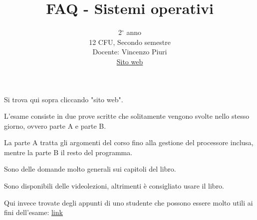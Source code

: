 \documentclass{article}
\title{FAQ - \textbf{Sistemi operativi}}
\date{}
\author{
	2$^{\circ}$ anno\\12 CFU, Secondo semestre\\
	Docente: Vincenzo Piuri\\ 
	\href{https://vpiuriso.ariel.ctu.unimi.it/v5/home/Default.aspx}{Sito web}
}
\begin{document}
 
	\maketitle
	
	\begin{QuestionList}
		
		 {
		     Si trova qui sopra cliccando "sito web".
		 }
		
		 {
		    L'esame consiste in due prove scritte che solitamente vengono svolte nello stesso giorno, ovvero parte A e parte B.
		    
		    La parte A tratta gli argomenti del corso fino alla gestione del processore inclusa, mentre la parte B il resto del programma.
		    
		    Sono delle domande molto generali sui capitoli del libro.
		}
		
		
		 {
		    Sono disponibili delle videolezioni, altrimenti è consigliato usare il libro.
		    
		    Qui invece trovate degli appunti di uno studente che possono essere molto utili ai fini dell'esame: \href{http://www.swappa.it/wiki/Uni/SistemiOperativi}{link}
		}
		
	\end{QuestionList}
	
\end{document}
